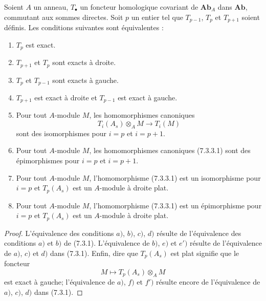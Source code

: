 \begin{proposition}[7.3.3]
Soient $A$ un anneau, $T_\bullet$ un foncteur homologique covariant de
$\mathbf{Ab}_A$ dans $\mathbf{Ab}$, commutant aux sommes directes. Soit $p$ un
entier tel que $T_{p-1}$, $T_p$ et $T_{p+1}$ soient définis. Les conditions
suivantes sont équivalentes :
\begin{enumerate}
  \item[a)] $T_p$ est exact.
  \item[b)] $T_{p+1}$ et $T_p$ sont exacts à droite.
  \item[c)] $T_p$ et $T_{p-1}$ sont exacts à gauche.
  \item[d)] $T_{p+1}$ est exact à droite et $T_{p-1}$ est exact à gauche.
  \item[e)] Pour tout $A$-module $M$, les homomorphismes canoniques
    \[
      T_i(A_s)\otimes_A M\longrightarrow T_i(M)
      \tag{7.3.3.1}\label{III.7.3.3.1.fr}
    \]
    sont des isomorphismes pour $i=p$ et $i=p+1$.
  \item[$e'$)] Pour tout $A$-module $M$, les homomorphismes canoniques
    (7.3.3.1) sont des épimorphismes pour $i=p$ et $i=p+1$.
  \item[f)] Pour tout $A$-module $M$, l'homomorphisme (7.3.3.1) est un
    isomorphisme pour $i=p$ et $T_p(A_s)$ est un $A$-module à droite plat.
  \item[$f'$)] Pour tout $A$-module $M$, l'homomorphisme (7.3.3.1) est un
    épimorphisme pour $i=p$ et $T_p(A_s)$ est un $A$-module à droite plat.
\end{enumerate}
\end{proposition}

\begin{proof}
L'équivalence des conditions $a)$, $b)$, $c)$, $d)$ résulte de l'équivalence
des conditions $a)$ et $b)$ de (7.3.1). L'équivalence de $b)$, $e)$ et $e')$
résulte de l'équivalence de $a)$, $c)$ et $d)$ dans (7.3.1). Enfin, dire que
$T_p(A_s)$ est plat signifie que le foncteur
\[
  M\mapsto T_p(A_s)\otimes_A M
\]
est exact à gauche; l'équivalence de $a)$, $f)$ et $f')$ résulte encore de
l'équivalence de $a)$, $c)$, $d)$ dans (7.3.1).
\end{proof}

